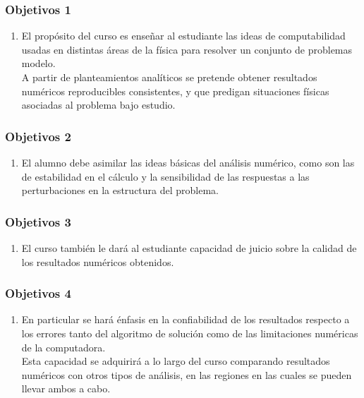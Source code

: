 \documentclass[12pt]{beamer}
\begin{document}
\begin{frame}
\frametitle{Objetivos 1}
\begin{enumerate}[<+->]
\item  El propósito del curso es enseñar al estudiante las ideas de computabilidad usadas en distintas áreas de la física para resolver un conjunto de problemas modelo. 
\\
\bigskip
\pause
A partir de planteamientos analíticos se pretende obtener resultados numéricos reproducibles consistentes, y que predigan situaciones físicas asociadas al problema bajo estudio.
\seti
\end{enumerate}
\end{frame}
\begin{frame}
\frametitle{Objetivos 2}
\begin{enumerate}[<+->]
\conti
\item El alumno debe asimilar las ideas básicas del análisis numérico, como son las de estabilidad en el cálculo y la sensibilidad de las respuestas a las perturbaciones en la estructura del problema.
\seti
\end{enumerate}
\end{frame}
\begin{frame}
\frametitle{Objetivos 3}
\begin{enumerate}[<+->]
\conti
\item El curso también le dará al estudiante capacidad de juicio sobre la calidad de los resultados numéricos obtenidos.
\seti
\end{enumerate}
\end{frame}
\begin{frame}
\frametitle{Objetivos 4}
\begin{enumerate}[<+->]
\conti
\item En particular se hará énfasis en la confiabilidad de los resultados respecto a los errores tanto del algoritmo de solución como de las limitaciones numéricas de la computadora. 
\\
\bigskip
\pause
Esta capacidad se adquirirá a lo largo del curso comparando resultados numéricos con otros tipos de análisis, en las regiones en las cuales se pueden llevar ambos a cabo.
\conti
\end{enumerate}
\end{frame}
\end{document}
